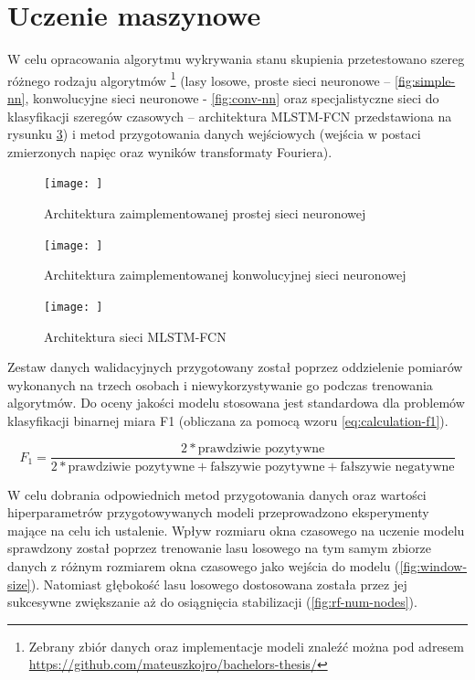 \documentclass{./assets/wfis}
\begin{document}
\section{Uczenie maszynowe}\label{uczenie-maszynowe}
W celu opracowania algorytmu wykrywania stanu skupienia przetestowano szereg różnego rodzaju algorytmów \footnote{Zebrany zbiór danych oraz implementacje modeli znaleźć można pod adresem \url{https://github.com/mateuszkojro/bachelors-thesis/}} (lasy losowe, proste sieci neuronowe – \autoref{fig:simple-nn}, konwolucyjne sieci neuronowe - \autoref{fig:conv-nn} oraz specjalistyczne sieci do klasyfikacji szeregów czasowych – architektura MLSTM-FCN \cite{karim_multivariate_2019} przedstawiona na rysunku \ref{fig:mlstm}) i metod przygotowania danych wejściowych (wejścia w postaci zmierzonych napięc oraz wyników transformaty Fouriera).

\begin{figure}[h!]
    \centering
    \texttt{[image: ]}
    \caption{Architektura zaimplementowanej prostej sieci neuronowej}
    \label{fig:simple-nn}
\end{figure}

\begin{figure}[h!]
    \centering
    \texttt{[image: ]}
    \caption{Architektura zaimplementowanej konwolucyjnej sieci neuronowej}
    \label{fig:conv-nn}
\end{figure}

\begin{figure}[h!]
    \centering
    \texttt{[image: ]}
    \caption{Architektura sieci MLSTM-FCN}
    \label{fig:mlstm}
\end{figure}


Zestaw danych walidacyjnych przygotowany został poprzez oddzielenie pomiarów wykonanych na trzech osobach i niewykorzystywanie go podczas trenowania algorytmów. Do oceny jakości modelu stosowana jest standardowa dla problemów klasyfikacji binarnej miara F1 (obliczana za pomocą wzoru \ref{eq:calculation-f1}).

\begin{equation}\label{eq:calculation-f1}
    F_1 = \frac{2*\text{prawdziwie pozytywne}}{2*\text{prawdziwie pozytywne}+\text{fałszywie pozytywne}+\text{fałszywie negatywne}}
\end{equation}


W celu dobrania odpowiednich metod przygotowania danych oraz wartości hiperparametrów przygotowywanych modeli przeprowadzono eksperymenty mające na celu ich ustalenie. Wpływ rozmiaru okna czasowego na uczenie modelu sprawdzony został poprzez trenowanie lasu losowego na tym samym zbiorze danych z różnym rozmiarem okna czasowego jako wejścia do modelu (\autoref{fig:window-size}). Natomiast głębokość lasu losowego dostosowana została przez jej sukcesywne zwiększanie aż do osiągnięcia stabilizacji (\autoref{fig:rf-num-nodes}).
\end{document}

